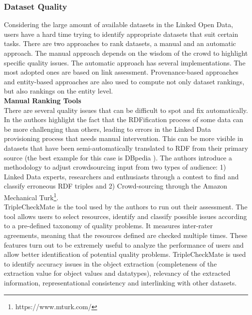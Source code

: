 \documentclass[onecolumn, crcready]{iosart2c}
\begin{document}
\subsubsection {Dataset Quality}
Considering the large amount of available datasets in the Linked Open Data, users have a hard time trying to identify appropriate datasets that suit certain tasks. There are two approaches to rank datasets, a manual and an automatic approach. The manual approach depends on the wisdom of the crowd to highlight specific quality issues. The automatic approach has several implementations. The most adopted ones are based on link assessment. Provenance-based approaches and entity-based approaches are also used to compute not only dataset rankings, but also rankings on the entity level.\\

\noindent
{\bf Manual Ranking Tools}\\

There are several quality issues that can be difficult to spot and fix automatically. In \cite{Acosta2013} the authors highlight the fact that the RDFification process of some data can be more challenging than others, leading to errors in the Linked Data provisioning process that needs manual intervention. This can be more visible in datasets that have been semi-automatically translated to RDF from their primary source (the best example for this case is DBpedia \cite{bizer_dbpedia_2009}). The authors introduce a methodology to adjust crowdsourcing input from two types of audience: 1) Linked Data experts, researchers and enthusiasts through a contest to find and classify erroneous RDF triples and 2) Crowd-sourcing through the Amazon Mechanical Turk\footnote{https://www.mturk.com/}.\\ TripleCheckMate \cite{Kontokostas2013} is the tool used by the authors to run out their assessment. The tool allows users to select resources, identify and classify possible issues according to a pre-defined taxonomy of quality problems. It measures inter-rater agreements, meaning that the resources defined are checked multiple times. These features turn out to be extremely useful to analyze the performance of users and allow better identification of potential quality problems. TripleCheckMate is used to identify accuracy issues in the object extraction (completeness of the extraction value for object values and datatypes), relevancy of the extracted information, representational consistency and interlinking with other datasets.\\
\end{document}
